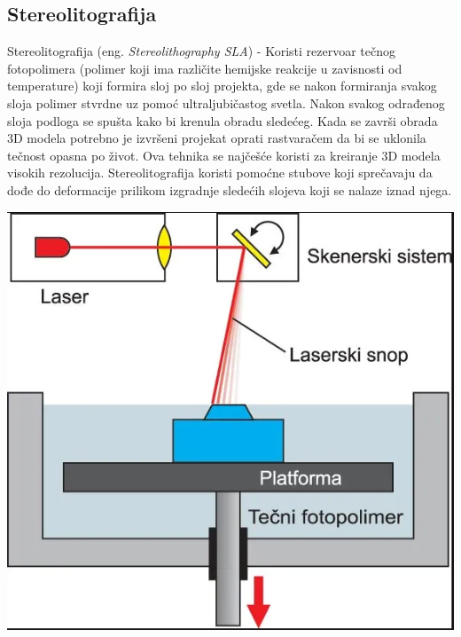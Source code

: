 \documentclass[a4paper]{article}
\begin{document}
\subsection{Stereolitografija}
\label{subsec:podnaslov3}
Stereolitografija (eng. \emph{Stereolithography SLA}) - Koristi rezervoar tečnog fotopolimera (polimer koji ima različite hemijske reakcije u zavisnosti od temperature) koji formira sloj po sloj projekta, gde se nakon formiranja svakog sloja polimer stvrdne uz pomoć ultraljubičastog svetla.
\bigbreak Nakon svakog odrađenog sloja podloga se spušta kako bi krenula obradu sledećeg. Kada se završi obrada 3D modela potrebno je izvršeni projekat oprati rastvaračem da bi se uklonila tečnost opasna po život.
\bigbreak Ova tehnika se najčešće koristi za kreiranje 3D modela visokih rezolucija.  Stereolitografija koristi pomoćne stubove koji sprečavaju da dođe do deformacije prilikom izgradnje sledećih slojeva koji se nalaze iznad njega.

\begin{center}
\includegraphics[width=.5\textwidth ]{Tehnikeslike/Stereolitografija.PNG}
\end{center}

\bigbreak
\bigbreak
\end{document}
